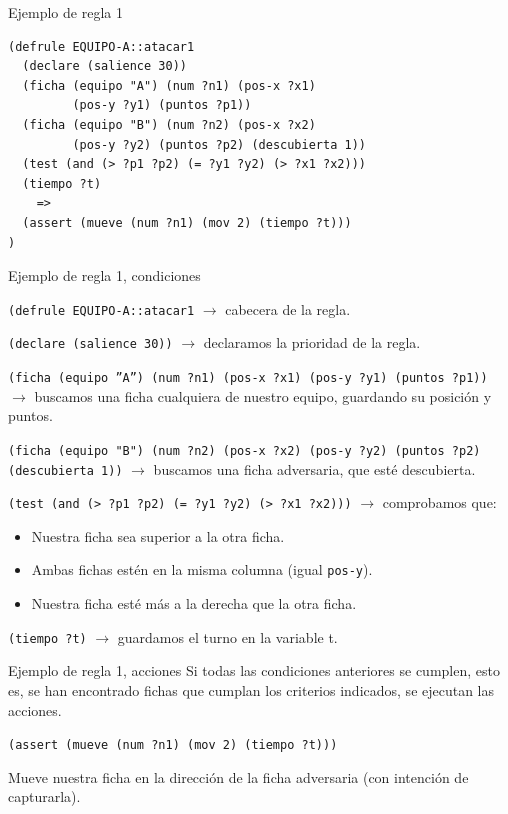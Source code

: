\documentclass[smaller,spanish,xcolor=svgnames]{beamer}
\begin{document}
\begin{frame}[fragile]{Ejemplo de regla 1}
\begin{verbatim}
(defrule EQUIPO-A::atacar1
  (declare (salience 30))
  (ficha (equipo "A") (num ?n1) (pos-x ?x1)
         (pos-y ?y1) (puntos ?p1))
  (ficha (equipo "B") (num ?n2) (pos-x ?x2)
         (pos-y ?y2) (puntos ?p2) (descubierta 1))
  (test (and (> ?p1 ?p2) (= ?y1 ?y2) (> ?x1 ?x2)))
  (tiempo ?t)
    =>
  (assert (mueve (num ?n1) (mov 2) (tiempo ?t)))
)
\end{verbatim}
\end{frame}

\begin{frame}[fragile]{Ejemplo de regla 1, condiciones}

  \small
  \texttt{(defrule EQUIPO-A::atacar1} $\rightarrow$ cabecera de la regla.

  \medskip

  \texttt{(declare (salience 30))} $\rightarrow$ declaramos la prioridad de la regla.

  \medskip

  \texttt{(ficha (equipo ''A'') (num ?n1) (pos-x ?x1) (pos-y ?y1) (puntos ?p1))} $\rightarrow$ buscamos una ficha cualquiera de nuestro equipo, guardando su posición y puntos.

  \medskip

  \texttt{(ficha (equipo "B") (num ?n2) (pos-x ?x2) (pos-y ?y2) (puntos ?p2) (descubierta 1))} $\rightarrow$ buscamos una ficha adversaria, que esté descubierta.

  \medskip

  \texttt{(test (and (> ?p1 ?p2) (= ?y1 ?y2) (> ?x1 ?x2)))} $\rightarrow$ comprobamos que:
  \begin{itemize}
  \item Nuestra ficha sea superior a la otra ficha.
  \item Ambas fichas estén en la misma columna (igual \texttt{pos-y}).
  \item Nuestra ficha esté más a la derecha que la otra ficha.
  \end{itemize}

  \medskip

  \texttt{(tiempo ?t)} $\rightarrow$ guardamos el turno en la variable t.
\end{frame}

\begin{frame}{Ejemplo de regla 1, acciones}
  Si todas las condiciones anteriores se cumplen, esto es, se han encontrado
  fichas que cumplan los criterios indicados, se ejecutan las acciones.

  \medskip

  \texttt{(assert (mueve (num ?n1) (mov 2) (tiempo ?t)))}

  \medskip

  Mueve nuestra ficha en la dirección de la ficha adversaria (con intención de capturarla).
\end{frame}
\end{document}
